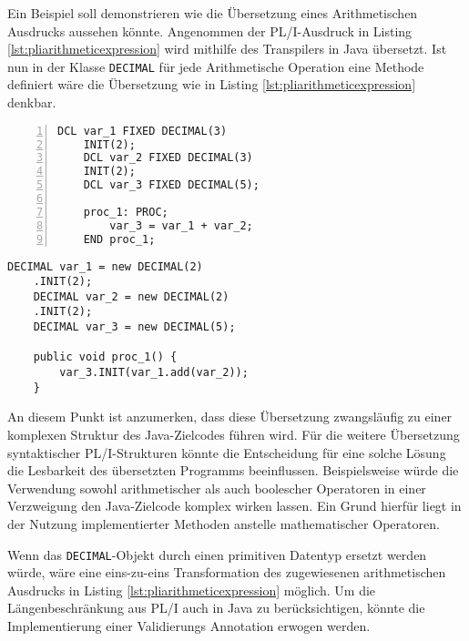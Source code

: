 Ein Beispiel soll demonstrieren wie die Übersetzung eines Arithmetischen Ausdrucks aussehen könnte.
Angenommen der PL/I-Ausdruck in Listing \ref{lst:pliarithmeticexpression} wird mithilfe des Transpilers in Java übersetzt.
Ist nun in der Klasse \verb+DECIMAL+ für jede Arithmetische Operation eine Methode definiert wäre die Übersetzung wie in Listing \ref{lst:pliarithmeticexpression} denkbar.

\begin{minipage}[b]{0.48\linewidth}{\newline}
	
	\centering
	\lstset{language=PL/I}
	\begin{lstlisting}[frame=single, numbers=left, mathescape,%
		caption={Transformation DECIMAL}, label={lst:pliarithmeticexpression}]
	DCL var_1 FIXED DECIMAL(3) 
	INIT(2);
	DCL var_2 FIXED DECIMAL(3) 
	INIT(2);
	DCL var_3 FIXED DECIMAL(5);
		
	proc_1: PROC;
		var_3 = var_1 + var_2;
	END proc_1;
	\end{lstlisting}
\end{minipage}
\hspace{0.5cm}
\begin{minipage}[b]{0.48\linewidth}
	\centering
	\lstset{language=Java}
	\begin{lstlisting}[frame=single, mathescape,%
		title={" "}]
	DECIMAL var_1 = new DECIMAL(2)
	.INIT(2);
	DECIMAL var_2 = new DECIMAL(2)
	.INIT(2);
	DECIMAL var_3 = new DECIMAL(5);
		
	public void proc_1() {
		var_3.INIT(var_1.add(var_2));
	}
	\end{lstlisting}
\end{minipage}

An diesem Punkt ist anzumerken, dass diese Übersetzung zwangsläufig zu einer komplexen Struktur des Java-Zielcodes führen wird. Für die weitere Übersetzung syntaktischer PL/I-Strukturen könnte die Entscheidung für eine solche Lösung die Lesbarkeit des übersetzten Programms beeinflussen. Beispielsweise würde die Verwendung sowohl arithmetischer als auch boolescher Operatoren in einer Verzweigung den Java-Zielcode komplex wirken lassen. Ein Grund hierfür liegt in der Nutzung implementierter Methoden anstelle mathematischer Operatoren.

Wenn das \verb+DECIMAL+-Objekt durch einen primitiven Datentyp ersetzt werden würde, wäre eine eins-zu-eins Transformation des zugewiesenen arithmetischen Ausdrucks in Listing \ref{lst:pliarithmeticexpression} möglich. Um die Längenbeschränkung aus PL/I auch in Java zu berücksichtigen, könnte die Implementierung einer Validierungs Annotation erwogen werden.

